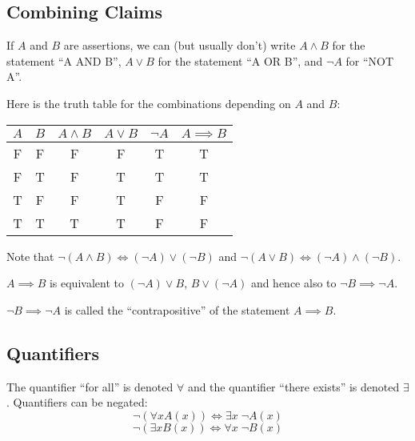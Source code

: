 \documentclass[../main.tex]{subfiles}
\begin{document}
\subsection{Combining Claims}
If $A$ and $B$ are assertions, we can (but usually don't) write $A \land B$ for the statement ``A AND B'', $A \lor B$ for the statement ``A OR B'', and $\lnot A$ for ``NOT A''.

Here is the truth table for the combinations depending on $A$ and $B$:\par
\begin{center}
\begin{tabular}{c|c|c|c|c|c}
  $A$ & $B$ & $A \land B$ & $A \lor B$ & $\lnot A$ & $A \implies B$ \\
\hline
  F & F & F & F & T & T \\
  F & T & F & T & T & T \\
  T & F & F & T & F & F \\
  T & T & T & T & F & F 
\end{tabular}
\end{center}\par
Note that $\lnot (A \land B) \iff (\lnot A) \lor (\lnot B)$ and $\lnot (A \lor B) \iff (\lnot A) \land (\lnot B)$.

$A \implies B$ is equivalent to $(\lnot A) \lor B$, $B \lor (\lnot A)$ and hence also to $\lnot B \implies \lnot A$.

$\lnot B \implies \lnot A$ is called the ``contrapositive'' of the statement $A \implies B$.

\subsection{Quantifiers}
The quantifier ``for all'' is denoted $\forall$ and the quantifier ``there exists'' is denoted $\exists$.
Quantifiers can be negated:
\[
  \lnot (\forall x A(x)) \iff \exists x\; \lnot A(x) 
\]
\[
  \lnot (\exists x B(x)) \iff \forall x\; \lnot B(x) 
\]
\end{document}

